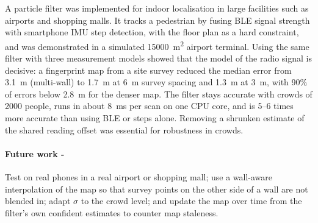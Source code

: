 \documentclass[11pt,a4paper]{article}
\begin{document}
A particle filter was implemented for indoor localisation in large facilities such as
airports and shopping malls. It tracks a pedestrian by fusing BLE signal strength with
smartphone IMU step detection, with the floor plan as a hard constraint, and was
demonstrated in a simulated \SI{15000}{m^2} airport terminal. Using the same filter with three measurement models showed that the
model of the radio signal is decisive: a fingerprint map from a site survey reduced the
median error from \SI{3.1}{m} (multi-wall) to \SI{1.7}{m} at \SI{6}{m} survey spacing and
\SI{1.3}{m} at \SI{3}{m}, with 90\% of errors below \SI{2.8}{m} for the denser map.
The filter stays accurate with crowds of 2000 people, runs in about \SI{8}{ms} per scan
on one CPU core, and is 5--6 times more accurate than using BLE or steps alone.
Removing a shrunken estimate of the shared reading offset was essential for robustness
in crowds.

\paragraph{Future work -} Test on real phones in a real airport or shopping mall; use a wall-aware interpolation of
the map so that survey points on the other side of a wall are not blended in; adapt
$\sigma$ to the crowd level; and update the map over time from the filter's own
confident estimates to counter map staleness.
\end{document}
